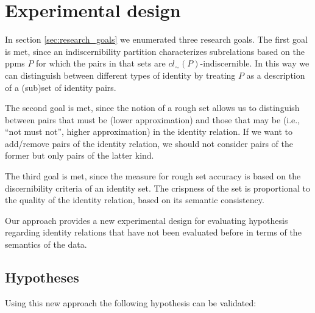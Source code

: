 \section{Experimental design}
\label{sec:experimental_design}

In section \ref{sec:research_goals} we enumerated three research goals.
The first goal is met, since an indiscernibility partition characterizes
  subrelations based on the ppms $P$ for which the pairs in that sets
  are $cl_{\sim}(P)$-indiscernible.
In this way we can distinguish between different types of identity
  by treating $P$ as a description of a (sub)set of identity pairs.

The second goal is met, since the notion of a rough set allows us to
  distinguish between pairs that must be (lower approximation)
  and those that may be (i.e., ``not must not'', higher approximation)
  in the identity relation.
If we want to add/remove pairs of the identity relation,
  we should not consider pairs of the former but only pairs of
  the latter kind.

The third goal is met, since the measure for rough set accuracy
  is based on the discernibility criteria of an identity set.
The crispness of the set is proportional to the quality of the
  identity relation, based on its semantic consistency.

Our approach provides a new experimental design for evaluating
  hypothesis regarding identity relations that have not been
  evaluated before in terms of the semantics of the data.

\subsection{Hypotheses}
\label{sec:hypotheses}

Using this new approach the following hypothesis can be validated:

